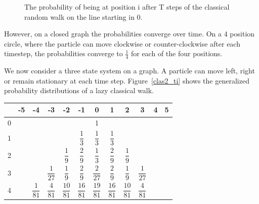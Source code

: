 \documentclass[a0,portrait]{a0poster}
\begin{document}
\begin{center}
{\begin{figure}
\caption{The probability of being at position i after T steps of the classical random walk on the line starting in 0.}
\label{clas_ti}
\end{figure}    

However, on a closed graph the probabilities converge over time. On a 4 position circle, where the particle can move clockwise or counter-clockwise after each timestep, the probabilities converge to $\frac{1}{4}$ for each of the four positions.

We now consider a three state system on a graph. A particle can move left, right or remain stationary at each time step. Figure~\ref{clas2_ti} shows the generalized probability distributions of a lazy classical walk.

\begin{center}
\small
\begin{tabular}{|c||c|c|c|c|c|c|c|c|c|c|c|}
\hline 
& -5 & -4 & -3 & -2 & -1 & 0 & 1 & 2 & 3 & 4 & 5 \\
\hline \hline
\hspace*{\fill} 0 \hspace*{\fill} &  &  &  &  &  & 1 &  &  &  &  & \\
\hline 
1 &  &  &  &  & 
$\dfrac{ 1 }{ 3 }$ &
$\dfrac{ 1 }{ 3 }$ &
$\dfrac{ 1 }{ 3 }$ &  &  &  & 
\hspace*{\fill} \\
\hline 
2 &  &  &  & 
$\dfrac{1}{9}$ & 
$\dfrac{ 2 }{ 9 }$ & 
$\dfrac{1}{3}$ & 
$\dfrac{ 2 }{ 9 }$ & 
$\dfrac{1}{9}$ &  &  & 
\hspace*{\fill} \\
\hline 
3 &  &  &  
$\dfrac{1}{27}$ &  
$\dfrac{ 1 }{ 9 }$ & 
$\dfrac{2}{9}$ &  
$\dfrac{ 2 }{ 27 }$ & 
$\dfrac{2}{9}$ &  
$\dfrac{ 1 }{ 9 }$ & 
$\dfrac{1}{27}$  &  & 
\hspace*{\fill} \\
\hline 
4 &  &
\hspace*{\fill} $\dfrac{1}{81}$ \hspace*{\fill} & 
$\dfrac{ 4 }{ 81 }$ & 
\hspace*{\fill} $\dfrac{10}{81}$ \hspace*{\fill} &  
$\dfrac{ 16 }{ 81 }$ & 
\hspace*{\fill} $\dfrac{19}{81}$ \hspace*{\fill} &  
$\dfrac{ 16 }{ 81 }$ & 
\hspace*{\fill} $\dfrac{10}{81}$ \hspace*{\fill} &  
$\dfrac{ 4 }{ 81 }$ & 

\end{tabular}
\end{center}}
\end{center}
\end{document}
